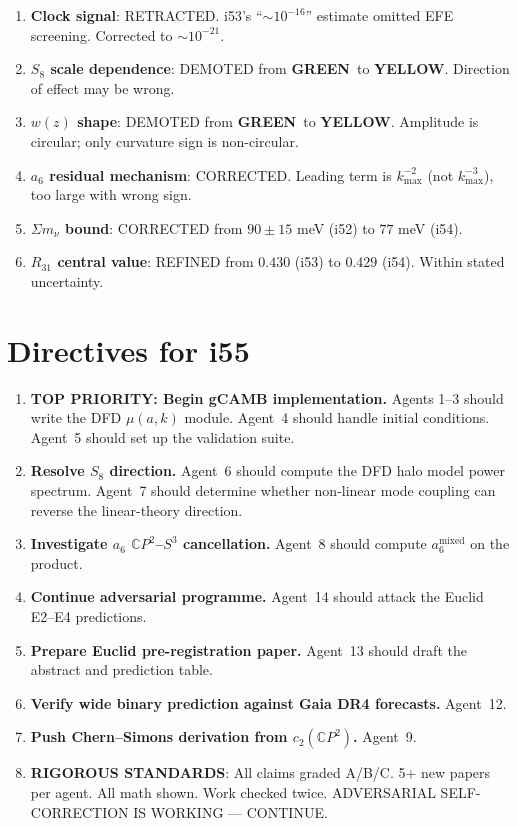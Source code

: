 \documentclass[11pt,a4paper]{article}
\newcommand{\GREEN}{\textcolor{dfdgreen}{\textbf{GREEN}}}
\newcommand{\YELLOW}{\textcolor{dfdyellow}{\textbf{YELLOW}}}
\newcommand{\CP}{\mathbb{C}P}
\begin{document}
\begin{enumerate}
\item \textbf{Clock signal}: RETRACTED. i53's ``$\sim 10^{-16}$'' estimate omitted EFE screening. Corrected to $\sim 10^{-21}$.
\item \textbf{$S_8$ scale dependence}: DEMOTED from \GREEN\ to \YELLOW. Direction of effect may be wrong.
\item \textbf{$w(z)$ shape}: DEMOTED from \GREEN\ to \YELLOW. Amplitude is circular; only curvature sign is non-circular.
\item \textbf{$a_6$ residual mechanism}: CORRECTED. Leading term is $k_{\max}^{-2}$ (not $k_{\max}^{-3}$), too large with wrong sign.
\item \textbf{$\Sigma m_\nu$ bound}: CORRECTED from $90 \pm 15$ meV (i52) to $77$ meV (i54).
\item \textbf{$R_{31}$ central value}: REFINED from $0.430$ (i53) to $0.429$ (i54). Within stated uncertainty.
\end{enumerate}


\section{Directives for i55}
\label{sec:directives}

\begin{enumerate}
\item \textbf{TOP PRIORITY: Begin gCAMB implementation.} Agents 1--3 should write the DFD $\mu(a,k)$ module. Agent~4 should handle initial conditions. Agent~5 should set up the validation suite.
\item \textbf{Resolve $S_8$ direction.} Agent~6 should compute the DFD halo model power spectrum. Agent~7 should determine whether non-linear mode coupling can reverse the linear-theory direction.
\item \textbf{Investigate $a_6$ $\CP^2$--$S^3$ cancellation.} Agent~8 should compute $a_6^{\mathrm{mixed}}$ on the product.
\item \textbf{Continue adversarial programme.} Agent~14 should attack the Euclid E2--E4 predictions.
\item \textbf{Prepare Euclid pre-registration paper.} Agent~13 should draft the abstract and prediction table.
\item \textbf{Verify wide binary prediction against Gaia DR4 forecasts.} Agent~12.
\item \textbf{Push Chern--Simons derivation from $c_2(\CP^2)$.} Agent~9.
\item \textbf{RIGOROUS STANDARDS}: All claims graded A/B/C. 5+ new papers per agent. All math shown. Work checked twice. ADVERSARIAL SELF-CORRECTION IS WORKING --- CONTINUE.
\end{enumerate}
\end{document}
